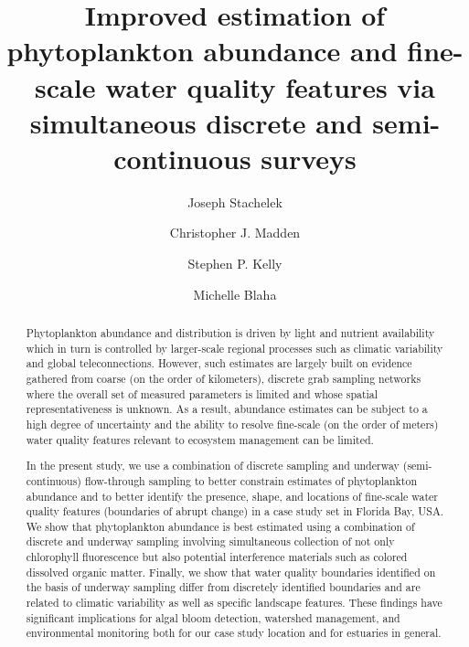 \documentclass[review]{elsarticle}
\begin{document}
  
  \begin{frontmatter}
  
  \title{Improved estimation of phytoplankton abundance and fine-scale water quality features via simultaneous discrete and semi-continuous surveys}

  \author[sfwmd,msu]{Joseph Stachelek}

  \author[sfwmd]{Christopher J. Madden}
  \author[sfwmd]{Stephen P. Kelly}
  \author[sfwmd]{Michelle Blaha}
    
  \address[sfwmd]{South Florida Water Management District \\
                 Everglades Systems Assessment Section \\
                 West Palm Beach, FL 33406, USA \\}
  \address[msu]{Department of Fisheries and Wildlife \\
                Michigan State University, \\
                East Lansing, MI 48824, USA \\}
  
  \begin{abstract}
    Phytoplankton abundance and distribution is driven by light and nutrient availability which in turn is controlled by larger-scale regional processes such as climatic variability and global teleconnections. However, such estimates are largely built on evidence gathered from coarse (on the order of kilometers), discrete grab sampling networks where the overall set of measured parameters is limited and whose spatial representativeness is unknown. As a result, abundance estimates can be subject to a high degree of uncertainty and the ability to resolve fine-scale (on the order of meters) water quality features relevant to ecosystem management can be limited. 

    In the present study, we use a combination of discrete sampling and underway (semi-continuous) flow-through sampling to better constrain estimates of phytoplankton abundance and to better identify the presence, shape, and locations of fine-scale water quality features (boundaries of abrupt change) in a case study set in Florida Bay, USA. We show that phytoplankton abundance is best estimated using a combination of discrete and underway sampling involving simultaneous collection of not only chlorophyll fluorescence but also potential interference materials such as colored dissolved organic matter. Finally, we show that water quality boundaries identified on the basis of underway sampling differ from discretely identified boundaries and are related to climatic variability as well as specific landscape features. These findings have significant implications for algal bloom detection, watershed management, and environmental monitoring both for our case study location and for estuaries in general.
    

\end{abstract}
\end{frontmatter}
\end{document}
